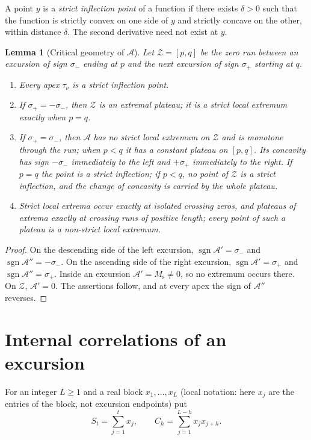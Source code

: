 \documentclass[11pt,reqno]{amsart}
\numberwithin{equation}{section}
\theoremstyle{plain}
\newtheorem{lemma}[theorem]{Lemma}
\theoremstyle{definition}
\theoremstyle{remark}
\DeclareMathOperator{\sgn}{sgn}
\newcommand{\Ms}{M_{\mathrm{s}}}
\newcommand{\Anet}{\mathcal{A}}
\begin{document}
A point $y$ is a \emph{strict inflection point} of a function if there
exists $\delta>0$ such that the function is strictly convex on one side of
$y$ and strictly concave on the other, within distance $\delta$. The second
derivative need not exist at $y$.

\begin{lemma}[Critical geometry of $\Anet$]
\label{lem:critical}
Let $\mathcal Z=[p,q]$ be the zero run between an excursion of sign $\sigma_-$ ending
at $p$ and the next excursion of sign $\sigma_+$ starting at $q$.
\begin{enumerate}[label=\textup{(\roman*)}]
\item Every apex $\tau_\nu$ is a strict inflection point.
\item If $\sigma_+=-\sigma_-$, then $\mathcal Z$ is an extremal plateau; it is a
strict local extremum exactly when $p=q$.
\item If $\sigma_+=\sigma_-$, then $\Anet$ has no strict local extremum on
$\mathcal Z$ and is monotone through the run; when $p<q$ it has a constant
plateau on $[p,q]$. Its concavity has sign $-\sigma_-$ immediately to the left
and $+\sigma_+$ immediately to the right. If $p=q$ the point is a strict inflection; if
$p<q$, no point of $\mathcal Z$ is a strict inflection, and the change of concavity
is carried by the whole plateau.
\item Strict local extrema occur exactly at isolated crossing zeros, and
plateaus of extrema exactly at crossing runs of positive length; every point
of such a plateau is a non-strict local extremum.
\end{enumerate}
\end{lemma}

\begin{proof}
On the descending side of the left excursion,
$\sgn\Anet'=\sigma_-$ and $\sgn\Anet''=-\sigma_-$. On the ascending side of
the right excursion, $\sgn\Anet'=\sigma_+$ and $\sgn\Anet''=\sigma_+$. Inside an excursion
$\Anet'=\Ms\ne0$, so no extremum occurs there. On
$\mathcal Z$, $\Anet'=0$. The assertions follow, and at every apex the sign of
$\Anet''$ reverses.
\end{proof}


\section{Internal correlations of an excursion}
\label{sec:internal_corr}

For an integer $L\ge1$ and a real block $x_1,\dots,x_L$ (local notation:
here $x_j$ are the entries of the block, not excursion endpoints) put
\begin{equation}
\label{eq:block_def}
S_t=\sum_{j=1}^t x_j,\qquad
C_h=\sum_{j=1}^{L-h}x_jx_{j+h}.
\end{equation}
\end{document}
